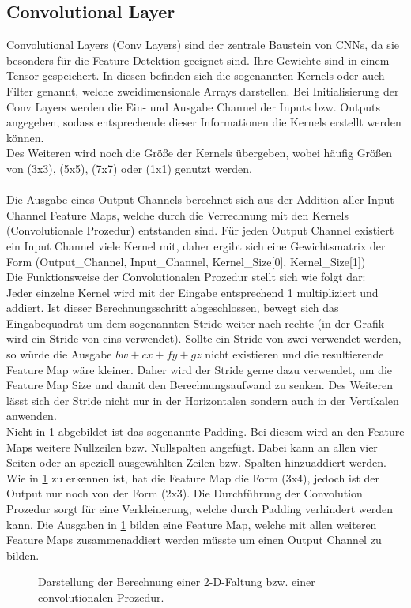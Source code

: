 \subsection{Convolutional Layer} \label{sec:Anhang_Conv_Layer}
Convolutional Layers (Conv Layers) sind der zentrale Baustein von CNNs, da sie besonders für die Feature Detektion geeignet sind. Ihre Gewichte sind in einem Tensor gespeichert. In diesen befinden sich die sogenannten Kernels oder auch Filter genannt, welche zweidimensionale Arrays darstellen. Bei Initialisierung der Conv Layers werden die Ein- und Ausgabe Channel der Inputs bzw. Outputs angegeben, sodass entsprechende dieser Informationen die Kernels erstellt werden können.\\
Des Weiteren wird noch die Größe der Kernels übergeben, wobei häufig Größen von (3x3), (5x5), (7x7) oder (1x1) genutzt werden.\\
\\Die Ausgabe eines Output Channels berechnet sich aus der Addition aller Input Channel Feature Maps, welche durch die Verrechnung mit den Kernels (Convolutionale Prozedur) entstanden sind. Für jeden Output Channel existiert ein Input Channel viele Kernel mit, daher ergibt sich eine Gewichtsmatrix der Form (Output\_Channel, Input\_Channel, Kernel\_Size[0], Kernel\_Size[1]) \cite[S. 369 ff.]{DL}\\
Die Funktionsweise der Convolutionalen Prozedur stellt sich wie folgt dar:\\
Jeder einzelne Kernel wird mit der Eingabe entsprechend \ref{fig:Conv2d} multipliziert und addiert. Ist dieser Berechnungsschritt abgeschlossen, bewegt sich das Eingabequadrat um dem sogenannten Stride weiter nach rechte (in der Grafik wird ein Stride von eins verwendet). Sollte ein Stride von zwei verwendet werden, so würde die Ausgabe $bw + cx + fy + gz$ nicht existieren und die resultierende Feature Map wäre kleiner. Daher wird der Stride gerne dazu verwendet, um die Feature Map Size und damit den Berechnungsaufwand zu senken. Des Weiteren lässt sich der Stride nicht nur in der Horizontalen sondern auch in der Vertikalen anwenden.\\
Nicht in \ref{fig:Conv2d} abgebildet ist das sogenannte Padding. Bei diesem wird an den Feature Maps weitere Nullzeilen bzw. Nullspalten angefügt. Dabei kann an allen vier Seiten oder an speziell ausgewählten Zeilen bzw. Spalten hinzuaddiert werden. Wie in \ref{fig:Conv2d} zu erkennen ist, hat die Feature Map die Form (3x4), jedoch ist der Output nur noch von der Form (2x3). Die Durchführung der Convolution Prozedur sorgt für eine Verkleinerung, welche durch Padding verhindert werden kann. \cite[S. 369 ff.]{DL}
Die Ausgaben in \ref{fig:Conv2d} bilden eine Feature Map, welche mit allen weiteren Feature Maps zusammenaddiert werden müsste um einen Output Channel zu bilden.
\begin{figure}[H]
	\centering
	\def\svgscale{0.95}
	
	\caption[Darstellung Convolutional Computation]{Darstellung der Berechnung einer 2-D-Faltung bzw. einer convolutionalen Prozedur. \cite[S. 373]{DL}}
	\label{fig:Conv2d}
\end{figure}

